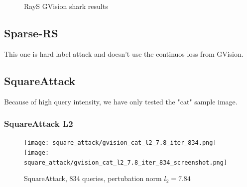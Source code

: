 \begin{figure}
\centering
 \hfill

\caption{RayS GVision shark results}
\label{fig:rays_results_shark}
\end{figure}

\subsection{Sparse-RS}
\label{rays_poc}
This one is hard label attack and doesn't use the continuos loss from GVision.
\cite{Croce2020SparseRSAV}


\subsection{SquareAttack}
\label{square_poc}
Because of high query intensity, we have only tested the "cat" sample image.
\cite{Andriushchenko2020SquareAA}

\subsubsection{SquareAttack L2}
\begin{figure}[!htb]
\null\hspace{1cm}
  \texttt{[image: square\_attack/gvision\_cat\_l2\_7.8\_iter\_834.png]}
\endminipage
\null\hspace{1cm}
  \texttt{[image: square\_attack/gvision\_cat\_l2\_7.8\_iter\_834\_screenshot.png]}
\endminipage
\caption{SquareAttack, 834 queries, pertubation norm $l_2 = 7.84$ }
\label{fig:square_cat_l2}
\end{figure}

